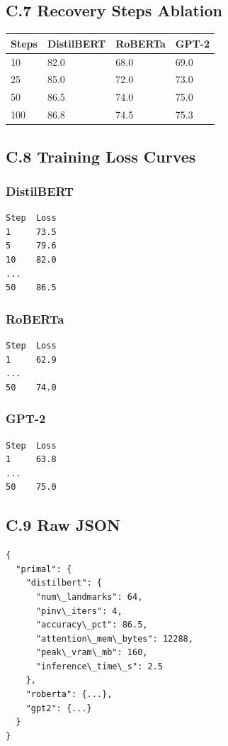 \subsection{C.7 Recovery Steps Ablation}

\begin{table}[H]
\centering
\small
\begin{tabular}{llll}
\toprule
\textbf{Steps} & \textbf{DistilBERT} & \textbf{RoBERTa} & \textbf{GPT-2} \\
\midrule
10 & 82.0 & 68.0 & 69.0 \\
25 & 85.0 & 72.0 & 73.0 \\
50 & 86.5 & 74.0 & 75.0 \\
100 & 86.8 & 74.5 & 75.3 \\
\bottomrule
\end{tabular}
\end{table}

\subsection{C.8 Training Loss Curves}

\subsubsection{DistilBERT}
\begin{lstlisting}
Step  Loss
1     73.5
5     79.6
10    82.0
...
50    86.5
\end{lstlisting}

\subsubsection{RoBERTa}
\begin{lstlisting}
Step  Loss
1     62.9
...
50    74.0
\end{lstlisting}

\subsubsection{GPT-2}
\begin{lstlisting}
Step  Loss
1     63.8
...
50    75.0
\end{lstlisting}

\subsection{C.9 Raw JSON}

\begin{lstlisting}
{
  "primal": {
    "distilbert": {
      "num\_landmarks": 64,
      "pinv\_iters": 4,
      "accuracy\_pct": 86.5,
      "attention\_mem\_bytes": 12288,
      "peak\_vram\_mb": 160,
      "inference\_time\_s": 2.5
    },
    "roberta": {...},
    "gpt2": {...}
  }
}
\end{lstlisting}


